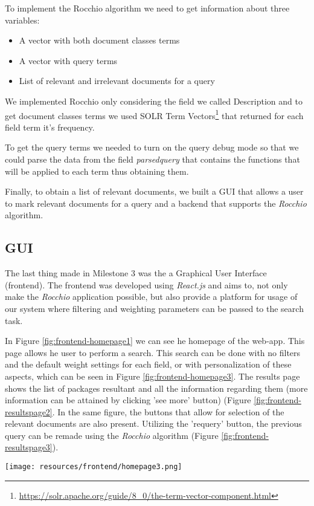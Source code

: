 To implement the Rocchio algorithm we need to get information about three variables:

\begin{itemize}
    \item A vector with both document classes terms
    \item A vector with query terms
    \item List of relevant and irrelevant documents for a query
\end{itemize}

We implemented Rocchio only considering the field we called Description and to get document classes terms we used SOLR Term Vectors\footnote{\url{https://solr.apache.org/guide/8_0/the-term-vector-component.html}} that returned for each field term it's frequency.

To get the query terms we needed to turn on the query debug mode so that we could parse the data from the field \textit{parsedquery} that contains the functions that will be applied to each term thus obtaining them.

Finally, to obtain a list of relevant documents, we built a GUI that allows a user to mark relevant documents for a query and a backend that supports the \emph{Rocchio} algorithm.


\subsection{GUI}

The last thing made in Milestone 3 was the a Graphical User Interface (frontend). The frontend was developed using \emph{React.js} and aims to, not only make the \emph{Rocchio} application possible, but also provide a platform for usage of our system where filtering and weighting parameters can be passed to the search task.

In Figure \ref{fig:frontend-homepage1} we can see he homepage of the web-app. This page allows he user to perform a search. This search can be done with no filters and the default weight settings for each field, or with personalization of these aspects, which can be seen in Figure \ref{fig:frontend-homepage3}. The results page shows the list of packages resultant and all the information regarding them (more information can be attained by clicking 'see more' button) (Figure \ref{fig:frontend-resultspage2}. In the same figure, the buttons that allow for selection of the relevant documents are also present. Utilizing the 'requery' button, the previous query can be remade using the \emph{Rocchio} algorithm (Figure \ref{fig:frontend-resultspage3}). 



\begin{figure*}[]
    \centering
    \texttt{[image: resources/frontend/homepage3.png]}
    \caption{Home page - Search with weights and filters}
    \label{fig:frontend-homepage3}
\end{figure*}





